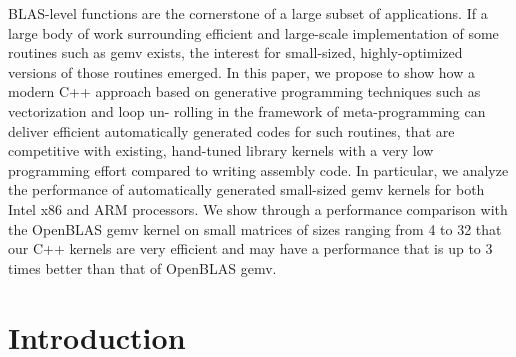 \documentclass[../../main.tex]{subfiles}
\begin{document}
BLAS-level functions are the cornerstone of a large
subset of applications. If a large body of work surrounding
efficient and large-scale implementation of some routines such
as gemv exists, the interest for small-sized, highly-optimized
versions of those routines emerged. In this paper, we propose
to show how a modern C++ approach based on generative
programming techniques such as vectorization and loop un-
rolling in the framework of meta-programming can deliver
efficient automatically generated codes for such routines, that
are competitive with existing, hand-tuned library kernels with
a very low programming effort compared to writing assembly
code. In particular, we analyze the performance of automatically
generated small-sized gemv kernels for both Intel x86 and ARM
processors. We show through a performance comparison with
the OpenBLAS gemv kernel on small matrices of sizes ranging
from 4 to 32 that our C++ kernels are very efficient and may
have a performance that is up to 3 times better than that of
OpenBLAS gemv.

\section{Introduction}
\end{document}
